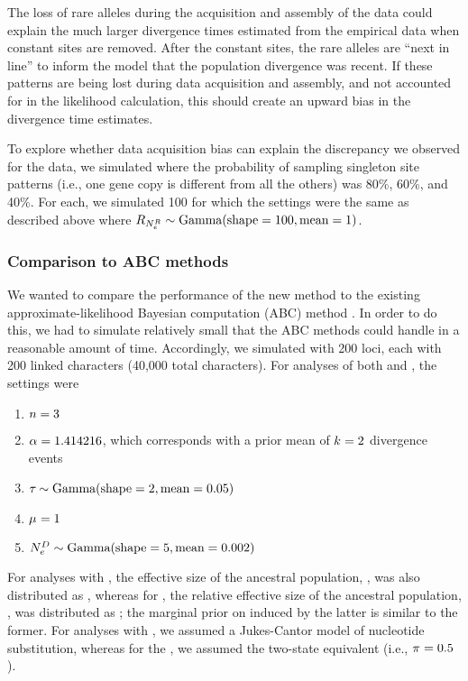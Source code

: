 The loss of rare alleles during the acquisition and assembly of the data could
explain the much larger divergence times estimated from the empirical data when
constant sites are removed.
After the constant sites, the rare alleles are ``next in line'' to inform the
model that the population divergence was recent.
If these patterns are being lost during data acquisition and assembly, and not
accounted for in the likelihood calculation, this should create an upward bias
in the divergence time estimates.

To explore whether data acquisition bias can explain the discrepancy we
observed for the  data, we simulated \datasets where the probability
of sampling singleton site patterns (i.e., one gene copy is different from all
the others) was 80\%, 60\%, and 40\%.
For each, we simulated 100 \datasets for which the settings were
the same as described above where
$\rootrelativepopsize \sim \dgamma{100}{1}$.


\subsubsection{Comparison to ABC methods}
We wanted to compare the performance of the new method to the existing
approximate-likelihood Bayesian computation (ABC) method \dppmsbayes 
\citep{Oaks2014dpp}.
In order to do this, we had to simulate relatively small \datasets that the ABC
methods could handle in a reasonable amount of time.
Accordingly, we simulated \datasets with 200 loci, each with 200 linked
characters (40,000 total characters).
For analyses of both \ecoevolity and \dppmsbayes, the settings were
\begin{enumerate}
    \item $\ncomparisons = 3$
    \item $\concentration = 1.414216$, which corresponds with a prior mean of
        $\nevents = 2$ divergence events
    \item $\divtime \sim \dgamma{2}{0.05}$
    \item $\murate = 1$
    \item $\epopsize[\descendantpopindex{}] \sim \dgamma{5}{0.002}$
\end{enumerate}
For analyses with \dppmsbayes, the effective size of the ancestral population,
\epopsize[\rootpopindex], was also distributed as , whereas
for \ecoevolity, the relative effective size of the ancestral population,
\rootrelativepopsize, was distributed as ;
the marginal prior on \epopsize[\rootpopindex] induced by the latter is similar
to the former.
For analyses with \dppmsbayes, we assumed a Jukes-Cantor model of nucleotide
substitution, whereas for the \ecoevolity, we assumed the two-state equivalent
(i.e., $\gfreq = 0.5$).

